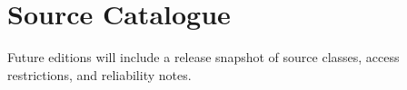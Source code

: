 \chapter{Source Catalogue}


Future editions will include a release snapshot of source classes, access restrictions, and reliability notes.

